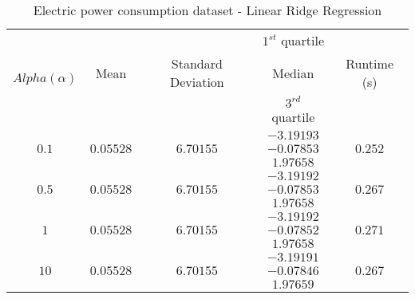 \begin{table}[p]
\begin{center}
		\begin{tabular}{|c|c|c|c|c|}
			\hline \multirow{3}{*}{$Alpha (\alpha)$} &&& $1^{st}$ quartile
			&\\&Mean&Standard Deviation&Median& Runtime (s)\\&&& $3^{rd}$ quartile &\\
			\hline \multirow{3}{*}{$0.1$}&&&$-3.19193$&\\
			& $0.05528$ & $6.70155$  & $-0.07853$ & $0.252$\\
			&&&$1.97658$& \\
			\hline \multirow{3}{*}{$0.5$}&&&$-3.19192$ &\\
			& $0.05528$ & $6.70155$  & $-0.07853$ & $0.267$\\
			&&&	$1.97658$& \\
			\hline \multirow{3}{*}{$1$}&&&	$-3.19192$ &\\
			& $0.05528$ & $6.70155$  & $-0.07852$ & $0.271$\\
			&&&	$1.97658$& \\
			\hline \multirow{3}{*}{$10$}&&&	$-3.19191$ &\\
			& $0.05528$ & $6.70155$  & $-0.07846$ & $0.267$\\
			&&&	$1.97659$& \\
			\hline

		\end{tabular}
	\end{center}
\caption{Electric power consumption dataset - Linear Ridge
Regression\label{ypmsd:table:ds3lrrresults}}

\end{table}




